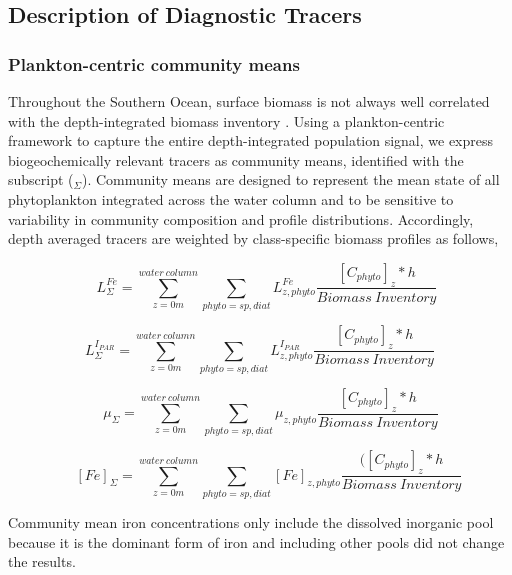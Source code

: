 \documentclass{article}
\begin{document}

\subsection{Description of Diagnostic Tracers}

\subsubsection{Plankton-centric community means}

Throughout the Southern Ocean, surface biomass is not always well correlated with the depth-integrated biomass inventory \parencite{RohrVariabilitymechanismscontrolling2017}. Using a plankton-centric framework to capture the entire depth-integrated population signal, we express biogeochemically relevant tracers as community means, identified with the subscript ($_{\Sigma}$). Community means are designed to represent the mean state of all phytoplankton integrated across the water column and to be sensitive to variability in community composition and profile distributions. Accordingly, depth averaged tracers are weighted by class-specific biomass profiles as follows,
    
\begin{equation}
    \quad L^{Fe}_\Sigma = \sum_{z=0m}^{water \ column} \sum_{phyto = sp, diat} L^{Fe}_{z,phyto} \frac{[C_{phyto}]_z*h}{Biomass \ Inventory}
\end{equation}
    
\begin{equation}
    L^{I_{PAR}}_\Sigma = \sum_{z=0m}^{water \ column} \sum_{phyto = sp, diat} L^{I_{PAR}}_{z,phyto} \frac{[C_{phyto}]_z*h}{Biomass \ Inventory}
\end{equation}

\begin{equation}
   \quad \; \;  \mu_\Sigma = \sum_{z=0m}^{water \ column} \sum_{phyto = sp, diat} \mu_{z,phyto} \frac{[C_{phyto}]_z*h}{Biomass \ Inventory}
\end{equation}

\begin{equation}
     \quad \; [Fe]_\Sigma = \sum_{z=0m}^{water \ column} \sum_{phyto = sp, diat} [Fe]_{z, phyto} \frac{([C_{phyto}]_z*h}{Biomass \ Inventory }
\end{equation}


 Community mean iron concentrations only include the dissolved inorganic pool because it is the dominant form of iron and including other pools did not change the results.  
\end{document}
